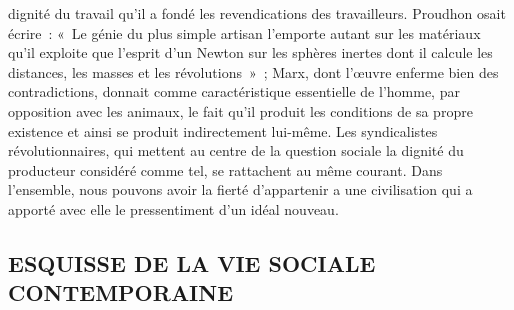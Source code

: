 \documentclass[french,twoside]{book} %
\begin{document}
dignité du travail qu'il a fondé les revendications des travailleurs. Proudhon osait écrire : « Le génie du plus simple artisan l'emporte autant sur les matériaux qu'il exploite que l'esprit d'un Newton sur les sphères inertes dont il calcule les distances, les masses et les révolutions » ; Marx, dont l'œuvre enferme bien des contradictions, donnait comme caractéristique essentielle de l'homme, par opposition avec les animaux, le fait qu'il produit les conditions de sa propre existence et ainsi se produit indirectement lui-même. Les syndicalistes révolutionnaires, qui mettent au centre de la question sociale la dignité du producteur considéré comme tel, se rattachent au même courant. Dans l'ensemble, nous pouvons avoir la fierté d'appartenir a une civilisation qui a apporté avec elle le pressentiment d'un idéal nouveau.
\subsection[{ESQUISSE DE LA VIE SOCIALE. CONTEMPORAINE}]{ESQUISSE DE LA VIE SOCIALE \\
CONTEMPORAINE}
\end{document}
